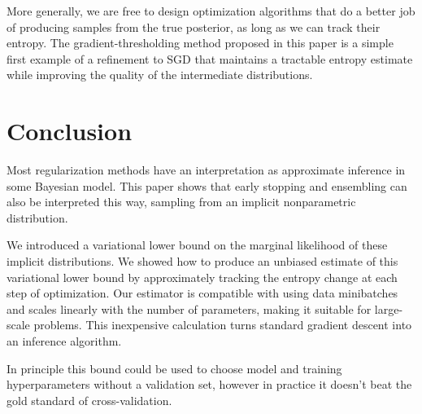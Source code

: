 \documentclass[]{article}
\begin{document}
More generally, we are free to design optimization algorithms that do a better job of producing samples from the true posterior, as long as we can track their entropy.
The gradient-thresholding method proposed in this paper is a simple first example of a refinement to SGD that maintains a tractable entropy estimate while improving the quality of the intermediate distributions.

\section{Conclusion}

Most regularization methods have an interpretation as approximate inference in some Bayesian model.
This paper shows that early stopping and ensembling can also be interpreted this way, sampling from an implicit nonparametric distribution.


We introduced a variational lower bound on the marginal likelihood of these implicit distributions.
We showed how to produce an unbiased estimate of this variational lower bound by approximately tracking the entropy change at each step of optimization.
Our estimator is compatible with using data minibatches and scales linearly with the number of parameters, making it suitable for large-scale problems.
This inexpensive calculation turns standard gradient descent into an inference algorithm.

In principle this bound could be used to choose model and training hyperparameters without a validation set, however  in practice it doesn't beat the gold standard of cross-validation.






\end{document}
